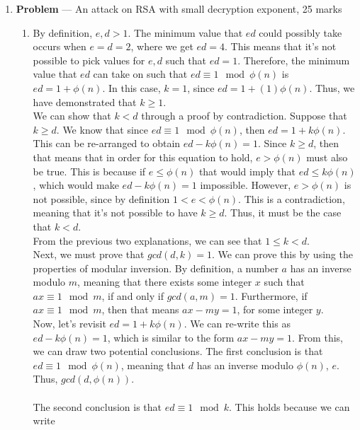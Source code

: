 \documentclass[11pt]{article}
\theoremstyle{definition}
\newcounter{problem}
\begin{document}
\begin{enumerate}
\newpage

\item[]  \textbf{Problem \theproblem} --- An attack on RSA with small decryption exponent, 25
    marks

\begin{enumerate}

\item %
By definition, $e, d > 1$. The minimum value that $ed$ could possibly take occurs when $e = d = 2$, where we get $ed = 4$. This means that it's not possible to pick values for $e, d$ such that $ed = 1$. Therefore, the minimum value that $ed$ can take on such that $ed \equiv 1 \mod{\phi(n)}$ is $ed = 1 + \phi{(n)}$. In this case, $k = 1$, since $ed = 1 + (1)\phi{(n)}$. Thus, we have demonstrated that $k \geq 1$. \\

We can show that $k < d$ through a proof by contradiction. Suppose that $k \geq d$. We know that since $ed \equiv 1 \mod{\phi(n)}$, then $ed = 1 + k\phi(n)$. This can be re-arranged to obtain $ed - k\phi(n) = 1$. Since $k \geq d$, then that means that in order for this equation to hold, $e > \phi(n)$ must also be true. This is because if $e \leq \phi(n)$ that would imply that $ed \leq k\phi(n)$, which would make $ed - k\phi(n) = 1$ impossible. However, $e > \phi(n)$ is not possible, since by definition $1 < e < \phi(n)$. This is a contradiction, meaning that it's not possible to have $k \geq d$. Thus, it must be the case that $k < d$. \\

From the previous two explanations, we can see that $1 \leq k < d$. \\

Next, we must prove that $gcd(d, k) = 1$. We can prove this by using the properties of modular inversion. By definition, a number $a$ has an inverse modulo $m$, meaning that there exists some integer $x$ such that $ax \equiv 1 \mod{m}$, if and only if $gcd(a, m) = 1$. Furthermore, if $ax \equiv 1 \mod{m}$, then that means $ax - my = 1$, for some integer $y$. \\

Now, let's revisit $ed = 1 + k\phi(n)$. We can re-write this as $ed - k\phi(n) = 1$, which is similar to the form $ax - my = 1$. From this, we can draw two potential conclusions. The first conclusion is that $ed \equiv 1 \mod{\phi(n)}$, meaning that $d$ has an inverse modulo $\phi(n)$, $e$. Thus, $gcd(d, \phi(n))$. 
\\ \\
The second conclusion is that $ed \equiv 1 \mod{k}$. This holds because we can write 


\end{enumerate}
\end{enumerate}
\end{document}

